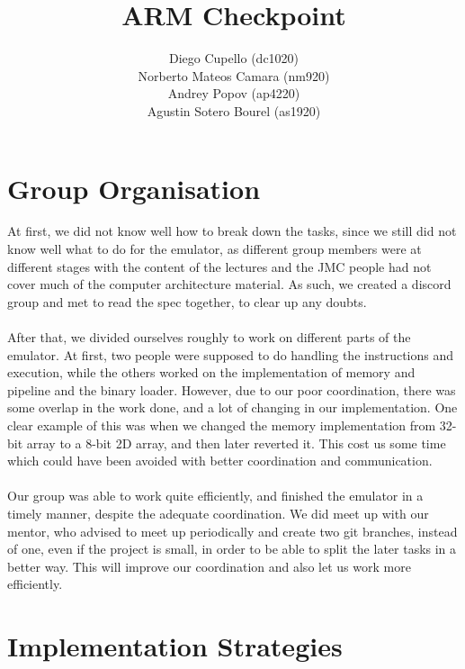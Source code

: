 \documentclass[11pt]{article}
\begin{document}
\title{ARM Checkpoint }
\author{Diego Cupello      (dc1020)\\
Norberto Mateos Camara     (nm920)\\
Andrey Popov               (ap4220)\\
Agustin Sotero Bourel      (as1920)\\}

\maketitle

\section{Group Organisation}

At first, we did not know well how to break down the tasks, since we still did not know well what to do for the emulator, as different group members were at different stages with the content of the lectures and the JMC people had not cover much of the computer architecture material. As such, we created a discord group and met to read the spec together, to clear up any doubts. \\ \\

After that, we divided ourselves roughly to work on different parts of the emulator. At first, two people were supposed to do handling the instructions and execution, while the others worked on the implementation of memory and pipeline and the binary loader. However, due to our poor coordination, there was some overlap in the work done, and a lot of changing in our implementation. One clear example of this was when we changed the memory implementation from 32-bit array to a 8-bit 2D array, and then later reverted it. This cost us some time which could have been avoided with better coordination and communication. \\ \\

Our group was able to work quite efficiently, and finished the emulator in a timely manner, despite the adequate coordination. We did meet up with our mentor, who advised to meet up periodically and create two git branches, instead of one, even if the project is small, in order to be able to split the later tasks in a better way. This will improve our coordination and also let us work more efficiently.

\section{Implementation Strategies}
\end{document}

